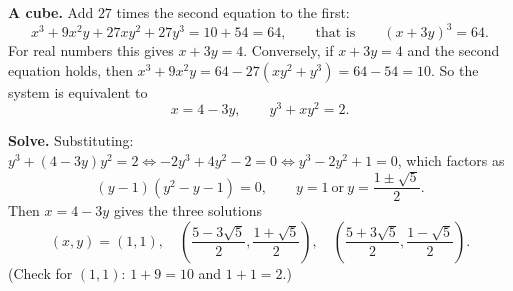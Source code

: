 \textbf{A cube.} Add $27$ times the second equation to the first:
\[x^3+9x^2y+27xy^2+27y^3=10+54=64,\qquad\text{that is}\qquad(x+3y)^3=64.\]
For real numbers this gives $x+3y=4$. Conversely, if $x+3y=4$ and the second equation holds, then $x^3+9x^2y=64-27\left(xy^2+y^3\right)=64-54=10$. So the system is equivalent to
\[x=4-3y,\qquad y^3+xy^2=2.\]

\textbf{Solve.} Substituting: $y^3+(4-3y)y^2=2\iff-2y^3+4y^2-2=0\iff y^3-2y^2+1=0$, which factors as
\[(y-1)\left(y^2-y-1\right)=0,\qquad y=1\ \text{or}\ y=\dfrac{1\pm\sqrt5}{2}.\]
Then $x=4-3y$ gives the three solutions
\[\boxed{(x,y)=(1,1),\quad\left(\dfrac{5-3\sqrt5}{2},\dfrac{1+\sqrt5}{2}\right),\quad\left(\dfrac{5+3\sqrt5}{2},\dfrac{1-\sqrt5}{2}\right)}.\]
(Check for $(1,1)$: $1+9=10$ and $1+1=2$.)
